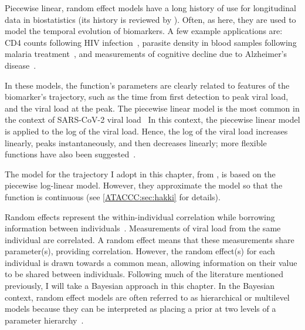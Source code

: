 \documentclass[thesis.tex]{subfiles}
\begin{document}
Piecewise linear, random effect models have a long history of use for longitudinal data in biostatistics (its history is reviewed by \textcite{slateStatistical}).
Often, as here, they are used to model the temporal evolution of biomarkers.
A few example applications are: CD4 counts following HIV infection~\autocite{langeHierarchical,lynchPredicting}, parasite density in blood samples following malaria treatment~\autocite{fogartyBayesian}, and measurements of cognitive decline due to Alzheimer's disease~\autocite{bealisleBayesian}.

In these models, the function's parameters are clearly related to features of the biomarker's trajectory, such as the time from first detection to peak viral load, and the viral load at the peak.
The piecewise linear model is the most common in the context of SARS-CoV-2 viral load~\autocite{clearyUsing,kisslerViral,larremoreTest}
In this context, the piecewise linear model is applied to the log of the viral load.
Hence, the log of the viral load increases linearly, peaks instantaneously, and then decreases linearly; more flexible functions have also been suggested~\autocite{quiltyQuarantine}.

The model for the trajectory I adopt in this chapter, from \textcite{hakkiOnset}, is based on the piecewise log-linear model.
However, they approximate the model so that the function is continuous (see \cref{ATACCC:sec:hakki} for details).

Random effects represent the within-individual correlation while borrowing information between individuals~\autocite[chapter 24]{lashModern}.
Measurements of viral load from the same individual are correlated.
A random effect means that these measurements share parameter(s), providing correlation.
However, the random effect(s) for each individual is drawn towards a common mean, allowing information on their value to be shared between individuals.
Following much of the literature mentioned previously, I will take a Bayesian approach in this chapter.
In the Bayesian context, random effect models are often referred to as hierarchical or multilevel models because they can be interpreted as placing a prior at two levels of a parameter hierarchy~\autocite[chapter 5]{gelmanBDA}.
\end{document}
